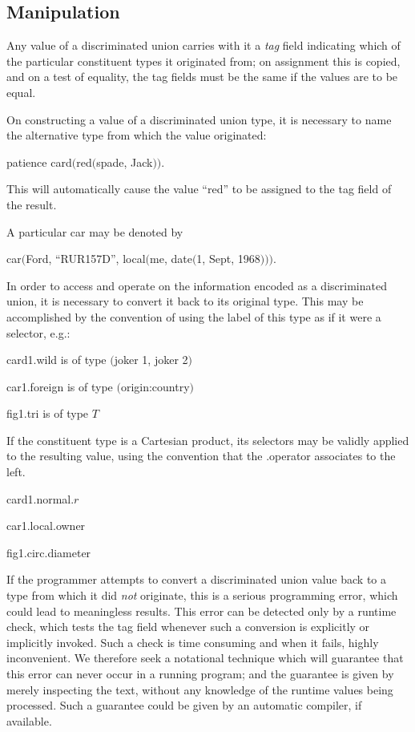 \documentclass[twoside,11pt]{book}
\begin{document}
\subsection{Manipulation}

Any value of a discriminated union carries with it a \textit{tag} field indicating which of the particular constituent types it originated from; on assignment this is copied, and on a test of equality, the tag fields must be the same if the values are to be equal.

On constructing a value of a discriminated union type, it is necessary to name the alternative type from which the value originated:
\smallskip

\quad patience card$($red$($spade, Jack$))$.
\smallskip

\noindent
This will automatically cause the value ``red'' to be assigned to the tag field of the result.

A particular car may be denoted by
\smallskip

\quad car$($Ford, ``RUR157D'', local$($me, date$($1, Sept, 1968$)))$.
\smallskip

In order to access and operate on the information encoded as a discriminated union, it is necessary to convert it back to its original type. This may be accomplished by the convention of using the label of this type as if it were a selector, e.g.:

card1.wild \tabto*{8em} is of type $($joker 1, joker 2$)$

car1.foreign \tabto*{8em} is of type $($origin:country$)$

fig1.tri \tabto*{8em} is of type $T$

\noindent
If the constituent type is a Cartesian product, its selectors may be validly applied to the resulting value, using the convention that the .operator associates to the left.

\quad card1.normal.$r$

\quad car1.local.owner

\quad fig1.circ.diameter

If the programmer attempts to convert a discriminated union value back to a type from which it did \textit{not} originate, this is a serious programming
error, which could lead to meaningless results. This error can be detected only by a runtime check, which tests the tag field whenever such a conversion is explicitly or implicitly invoked. Such a check is time consuming and when it fails, highly inconvenient. We therefore seek a notational technique which will guarantee that this error can never occur in a running program; and the guarantee is given by merely inspecting the text, without any knowledge of the runtime values being processed. Such a guarantee could be given by an automatic compiler, if available.
\end{document}
